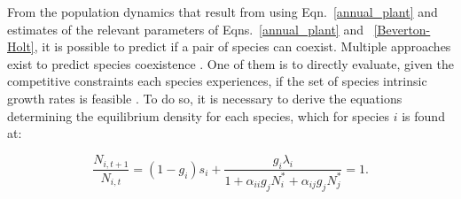 From the population dynamics that result from using Eqn.~\ref{annual_plant} and estimates of the relevant parameters of Eqns.~\ref{annual_plant} and ~\ref{Beverton-Holt},  it is possible to predict if a pair of species can coexist. Multiple approaches exist to predict species coexistence \citep{chesson_general_2000, chesson_updates_2018, barabas_chessons_2018, saavedra2017structural, letten_linking_2017}. One of them is to directly evaluate, given the competitive constraints each species experiences, if the set of species intrinsic growth rates is feasible \citep[i.e., if there exists an equilibrium point under which both species have positive abundances;][]{rohr_structural_2014, saavedra2017structural}. To do so, it is necessary to derive the equations determining the equilibrium density for each species, which for species $i$ is found at:

\begin{equation}
\label{equilbrium}
  \frac{N_{i,t+1}}{N_{i,t}}  = (1-g_{i})s_{i} + \frac{g_{i}\lambda_{i}}{1 + \alpha_{ii}g_{j}N_{i}^{*} + \alpha_{ij}g_{j}N_{j}^{*}}  = 1 .
\end{equation}

